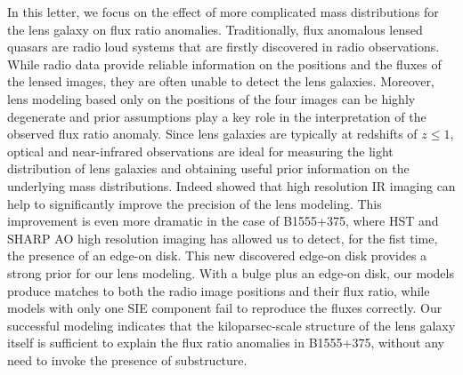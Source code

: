\documentclass[useAMS,usenatbib]{mn2e}
\begin{document}
In this letter, we focus on the effect of more complicated mass
distributions for the lens galaxy on flux ratio anomalies.
Traditionally, flux anomalous lensed quasars are radio loud systems
that are firstly discovered in radio observations. While radio data
provide reliable information on the positions and the fluxes of the
lensed images, they are often unable to detect the lens
galaxies. Moreover, lens modeling based only on the positions of the
four images can be highly degenerate and prior assumptions play a key
role in the interpretation of the observed flux ratio anomaly.  Since
lens galaxies are typically at redshifts of $z \leq 1$, optical and
near-infrared observations are ideal for measuring the light distribution
of lens galaxies and obtaining useful prior information on the underlying
mass distributions. Indeed \citet{SHARP12} showed that high
resolution IR imaging can help to significantly improve the precision
of the lens modeling. This improvement is even more dramatic in the
case of B1555+375, where HST and SHARP AO high resolution imaging has
allowed us to detect, for the fist time, the presence of an edge-on
disk. This new discovered edge-on disk provides a strong prior for our
lens modeling.  With a bulge plus an edge-on disk, our models produce
matches to both the radio image positions and their flux ratio, while
models with only one SIE component \citep{Marlow99,Xu14} fail to
reproduce the fluxes correctly. Our successful modeling indicates
that the kiloparsec-scale structure of the lens galaxy itself is
sufficient to explain the flux ratio anomalies in B1555+375, without
any need to invoke the presence of substructure.
\end{document}

